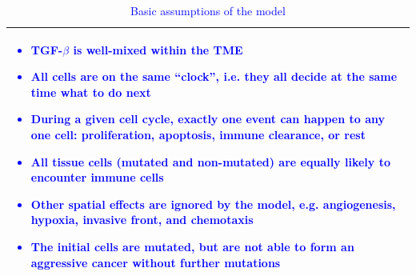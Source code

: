 \documentclass[11pt]{article}
\newcommand{\tcb} { \textcolor{blue} }
\begin{document}
\begin{table}[H]
\begin{tabular}{|p{\textwidth}|}
\hline
\tcb{
\begin{itemize}
\item TGF-$\beta$ is well-mixed within the TME
\item All cells are on the same ``clock'', i.e. they all decide at the same time what to do next
\item During a given cell cycle, exactly one event can happen to any one cell: proliferation, apoptosis, immune clearance, or rest
\item All tissue cells (mutated and non-mutated) are equally likely to encounter immune cells
\item Other spatial effects are ignored by the model, e.g. angiogenesis, hypoxia, invasive front, and chemotaxis
\item The initial cells are mutated, but are not able to form an aggressive cancer without further mutations
\end{itemize}
}
\\
\hline
\end{tabular}
\caption{\tcb{Basic assumptions of the model}}
\label{table:model_assumptions}
\end{table}
\end{document}
